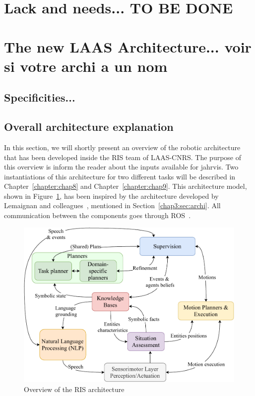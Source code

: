 \documentclass[a4paper,11pt,twoside]{StyleThese}
\begin{document}
\section{Lack and needs... TO BE DONE}

\section{The new LAAS Architecture... voir si votre archi a un nom}\label{chap3:sec:rob_archi}

\subsection{Specificities...}

\subsection{Overall architecture explanation}

In this section, we will shortly present an overview of the robotic architecture that has been developed inside the RIS team of LAAS-CNRS. The purpose of this overview is inform the reader about the inputs available for \acrshort{jahrvis}. Two instantiations of this architecture for two different tasks will be described in Chapter~\ref{chapter:chap8} and Chapter~\ref{chapter:chap9}. This architecture model, shown in Figure~\ref{chap3:fig:archi}, has been inspired by the architecture developed by Lemaignan and colleagues~\cite{lemaignan_2017_artificial}, mentioned in Section~\ref{chap3:sec:archi}. All communication between the components goes through ROS~\cite{quigley_2009_ros}.

\begin{figure}[!ht]
	\includegraphics[width=\linewidth]{figures/chapter2/archi_overview.pdf}
	\caption{Overview of the RIS architecture}
	\label{chap3:fig:archi}
\end{figure}
\end{document}
